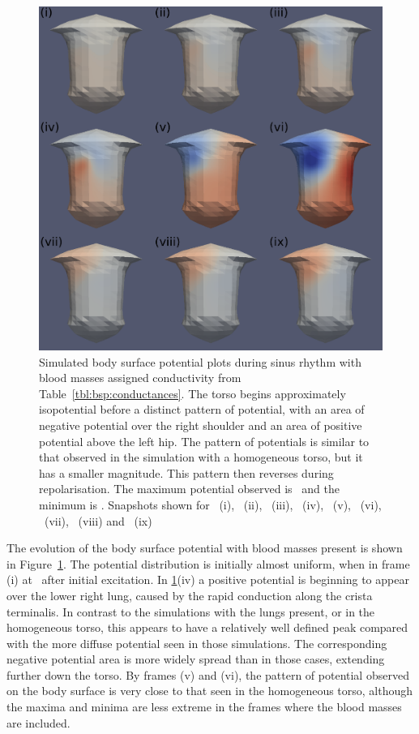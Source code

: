 \begin{figure}
\includegraphics{figures/bsp/bsp_blood}
\caption[Body Surface Potential snapshots, with blood masses]{
\label{bsp:fig:blood_bsp}
Simulated body surface potential plots during sinus rhythm with blood masses assigned
conductivity from Table~\ref{tbl:bsp:conductances}.
The torso begins approximately isopotential before a distinct pattern of
potential, with an area of negative potential over the right shoulder and an
area of positive potential above the left hip.
The pattern of potentials is similar to that observed in the simulation with a
homogeneous torso, but it has a smaller magnitude.
This pattern then reverses during repolarisation.
The maximum potential observed is \ and the minimum is .
Snapshots shown for \ (i), \ (ii), \ (iii), \ (iv),
\ (v), \ (vi), \ (vii), \ (viii) and \
(ix)
}
\end{figure}

The evolution of the body surface potential with blood masses present is shown in
Figure~\ref{bsp:fig:blood_bsp}.
The potential distribution is initially almost uniform, when  in frame (i) at
\ms{10}\ after initial excitation.
In \ref{bsp:fig:blood_bsp}(iv) a positive potential is beginning to appear over
the lower right lung, caused by the rapid conduction along the crista
terminalis.
In contrast to the simulations with the lungs present, or in the homogeneous
torso, this appears to have a relatively well defined peak compared with the
more diffuse potential seen in those simulations.
The corresponding negative potential area is more widely spread than in those
cases, extending further down the torso.
By frames (v) and (vi), the pattern of potential observed on the body surface is
very close to that seen in the homogeneous torso, although the maxima and minima
are less extreme in the frames where the blood masses are included.

